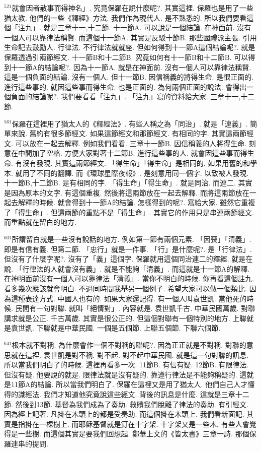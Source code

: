 \documentclass{book}
\begin{document}
$^{521}$就會因者赦事而得神名」.
究竟保羅在說什麼呢?.
其實這裡.
保羅也是用了一些猶太教.
他們的一些《釋經》方法.
我們作為現代人.
是不熟悉的.
所以我們要看這個「注九」.
就是三章十一,十二節.
十一節A.
可以說是一個結論.
在神面前.
沒有一個人可以靠律法稱賢.
而這個十一節A.
其實是反駁十節B.
那些國禮派主張.
引用生命記去鼓勵人.
行律法.
不行律法就就座.
但如何得到十一節A這個結論呢?.
就是保羅透過引兩節經文.
十一節B和十二節B.
究竟如何有十一節B和十二節B.
可以得到十一節A的結論呢?.
因為十一節A.
就是在神面前.
沒有一個人可以靠律法稱賢.
這是一個負面的結論.
沒有一個人.
但十一節B.
因信稱義的將得生命.
是很正面的.
進行這些事的.
就因這些事而得生命.
也是正面的.
為何兩個正面的說法.
會得出一個負面的結論呢?.
我們要看看「注九」.
「注九」寫的資料給大家.
三章十一,十二節.

$^{561}$保羅在這裡用了猶太人的《釋經法》.
有些人稱之為「同治」.
就是「連義」.
簡單來說.
舊約有很多節經文.
如果這節經文和那節經文.
有相同的字.
其實這兩節經文.
可以放在一起去解釋.
例如我們看看.
三章十一節B.
因信稱義的人將得生命.
刻意在中間加了空格.
方便大家對著十二節B.
進行這些事的人.
就會因這些事而得生命.
有沒有發現.
其實這兩節經文.
「得生命」「得生命」是相同的.
如果用舊的和學本.
就用了不同的翻譯.
而《環球星際夜報》.
是刻意用同一個字.
以致被人發現.
十一節B,十二節B.
是有相同的字.
「得生命」「得生命」.
就是同治.
而連二.
其實是因為原本的文字.
有這個重複.
然後將這兩節放在一起去解釋.
而將這兩節放在一起去解釋的時候.
就會得到十一節A的結論.
怎樣得到的呢?.
寫給大家.
雖然它重複了「得生命」.
但這兩節的重點不是「得生命」.
其實它的作用只是串連兩節經文.
而重點就在留白的地方.

$^{601}$所謂留白就是一些沒有說話的地方.
例如第一節有兩個元素.
「因喪」「清義」.
即是有信有義.
但第二節.
「忠行」就是一件事.
「行」是什麼呢?.
是「行律法」.
但沒有了什麼字呢?.
沒有了「義」這個字.
保羅就用這個同治連二的釋經.
就是在說.
「行律法的人就會沒有義」.
就是不能夠「清義」.
而這就是十一節A的解釋.
在神明面前沒有一個人可以靠律法「清義」.
當你不明白的時候.
你再看這個註九.
看多幾次應該就會明白.
不過同時間我舉另一個例子.
希望大家可以做一個類比.
因為這種表達方式.
中國人也有的.
如果大家還記得.
有一個人叫袁世凱.
當他死的時候.
民間有一句對聯.
就叫「絕情對」.
內容就是.
袁世凱千古.
中華民國萬歲.
對聯講求就是公正.
千古萬歲.
其實是很公正的.
但這個對聯有一個特別的地方.
上聯就是袁世凱.
下聯就是中華民國.
一個是五個節.
上聯五個節.
下聯六個節.

$^{641}$根本就不對稱.
為什麼會作一個不對稱的聯呢?.
因為正正就是不對稱.
對聯的意思就在這裡.
袁世凱是對不稱.
對不起.
對不起中華民國.
就是這一句對聯的訊息.
所以當我們明白了的時候.
這裡再看多一次.
11節B.
有信有疑.
12節B.
有限律法.
但沒有疑.
他要說的就是.
限律法就是沒有疑的.
靠遵行律法是不能夠稱疑的.
這就是11節A的結論.
所以當我們明白了.
保羅在這裡又是用了猶太人.
他們自己人才懂得的識經法.
我們才知道他究竟說這些經文.
背後的訊息是什麼.
這就是三章十二節.
然後到13節.
基督為我們成為了奏助.
救贖我們脫離了律法的奏助.
有引經文.
因為經上記著.
凡掛在木頭上的都是受奏助.
而這個掛在木頭上.
我們看新面記.
其實是指掛在一棵樹上.
而耶穌基督就是釘在十字架.
十字架又是一些木.
有些人會覺得是一些樹.
而這個其實是要我們回想起.
鄭華上文的《皆太書》三章一詩.
那個保羅連串的提問.
\end{document}
